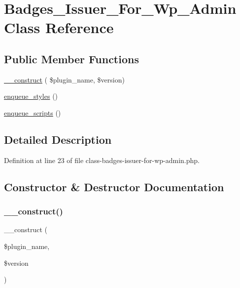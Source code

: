 \hypertarget{class_badges___issuer___for___wp___admin}{}\section{Badges\+\_\+\+Issuer\+\_\+\+For\+\_\+\+Wp\+\_\+\+Admin Class Reference}
\label{class_badges___issuer___for___wp___admin}
\subsection*{Public Member Functions}
\begin{DoxyCompactItemize}
\item 
\hyperlink{class_badges___issuer___for___wp___admin_a2408861a56b963cb8719d7f596cd800d}{\+\_\+\+\_\+construct} ( \$plugin\+\_\+name, \$version)
\item 
\hyperlink{class_badges___issuer___for___wp___admin_a6ec94168591737dfca849a6934db3cdf}{enqueue\+\_\+styles} ()
\item 
\hyperlink{class_badges___issuer___for___wp___admin_a8ccf2775cad89ac2c9609e2282c1bbeb}{enqueue\+\_\+scripts} ()
\end{DoxyCompactItemize}


\subsection{Detailed Description}


Definition at line 23 of file class-\/badges-\/issuer-\/for-\/wp-\/admin.\+php.



\subsection{Constructor \& Destructor Documentation}
\mbox{\label{class_badges___issuer___for___wp___admin_a2408861a56b963cb8719d7f596cd800d}} 
\subsubsection{\texorpdfstring{\+\_\+\+\_\+construct()}{\_\_construct()}}
{\footnotesize\ttfamily \+\_\+\+\_\+construct (\begin{DoxyParamCaption}\item[{}]{\$plugin\+\_\+name,  }\item[{}]{\$version }\end{DoxyParamCaption})}

